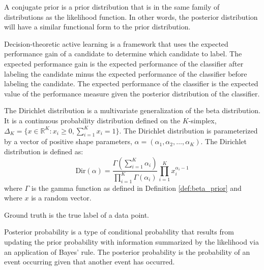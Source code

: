 \begin{defn}
\label{def:conjugate_prior}
A conjugate prior is a prior distribution that is in the same family of distributions as the likelihood function. In other words, the posterior distribution will have a similar functional form to the prior distribution.
\end{defn}

\begin{defn}
\label{def:decision_theoretic}
Decision-theoretic active learning is a framework that uses the expected performance gain of a candidate to determine which candidate to label. The expected performance gain is the expected performance of the classifier after labeling the candidate minus the expected performance of the classifier before labeling the candidate. The expected performance of the classifier is the expected value of the performance measure given the posterior distribution of the classifier.
\end{defn}

\begin{defn}
\label{def:dirichlet_distribution}
The Dirichlet distribution is a multivariate generalization of the beta distribution. It is a continuous probability distribution defined on the \(K\)-simplex, \(\Delta_K = \{x \in \mathbb{R}^K: x_i \geq 0, \sum_{i=1}^K x_i = 1\}\). The Dirichlet distribution is parameterized by a vector of positive shape parameters, \(\alpha = (\alpha_1, \alpha_2, \dots, \alpha_K)\). The Dirichlet distribution is defined as:
\[\text{Dir}(\alpha) = \frac{\Gamma(\sum_{i=1}^K \alpha_i)}{\prod_{i=1}^K \Gamma(\alpha_i)}\prod_{i=1}^K x_i^{\alpha_i - 1}\]
where \(\Gamma\) is the gamma function as defined in Definition \ref{def:beta_prior} and where \(x\) is a random vector.
\end{defn}

\begin{defn}
\label{def:ground_truth}
Ground truth is the true label of a data point.
\end{defn}

\begin{defn}
\label{def:posterior_probabilities}
Posterior probability is a type of conditional probability that results from updating the prior probability with information summarized by the likelihood via an application of Bayes' rule. The posterior probability is the probability of an event occurring given that another event has occurred.
\end{defn}

